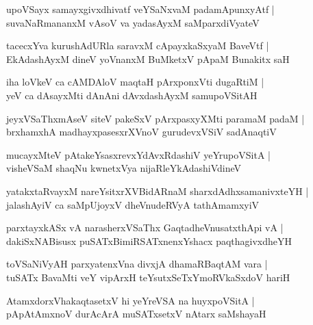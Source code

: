 \documentclass[twoside,12pt,openright]{book}
\newcounter{shloka}[chapter]
\begin{document}
\begin{shloka}%
upoVSayx samayxgivxdhivatf veYSaNxvaM padamApunxyAtf |\\
suvaNaRmananxM vAsoV va yadasAyxM saMparxdiVyateV 
\end{shloka}

\begin{shloka}%
tacecxYva kurushAdURla saravxM cApayxkaSxyaM BaveVtf |\\
EkAdashAyxM dineV yoVnanxM BuMketxV pApaM Bunakitx saH
\end{shloka}

\begin{shloka}%
iha loVkeV ca cAMDAloV maqtaH pArxponxVti dugaRtiM |\\
yeV ca dAsayxMti dAnAni dAvxdashAyxM samupoVSitAH
\end{shloka}

\begin{shloka}%
jeyxVSaThxmAseV siteV pakeSxV pArxpasxyXMti paramaM padaM |\\
brxhamxhA madhayxpasesxrXVnoV gurudevxVSiV sadAnaqtiV 
\end{shloka}

\begin{shloka}%
mucayxMteV pAtakeYsasxrevxYdAvxRdashiV yeYrupoVSitA |\\
visheVSaM shaqNu kwnetxVya nijaRleYkAdashiVdineV
\end{shloka}

\begin{shloka}%
yatakxtaRvayxM nareYsitxrXVBidARnaM sharxdAdhxsamanivxteYH |\\
jalashAyiV ca saMpUjoyxV dheVnudeRVyA tathAmamxyiV 
\end{shloka}

\begin{shloka}%
parxtayxkASx vA narasherxVSaThx GaqtadheVnusatxthApi vA |\\
dakiSxNABisusx puSATxBimiRSATxnenxYshacx paqthagivxdheYH
\end{shloka}

\begin{shloka}%
toVSaNiVyAH parxyatenxVna divxjA dhamaRBaqtAM vara |\\
tuSATx BavaMti veY vipArxH teYsutxSeTxYmoRVkaSxdoV hariH 
\end{shloka}

\begin{shloka}%
AtamxdorxVhakaqtasetxV hi yeYreVSA na huyxpoVSitA |\\
pApAtAmxnoV durAcArA muSATxsetxV nAtarx saMshayaH 
\end{shloka}
\end{document}
